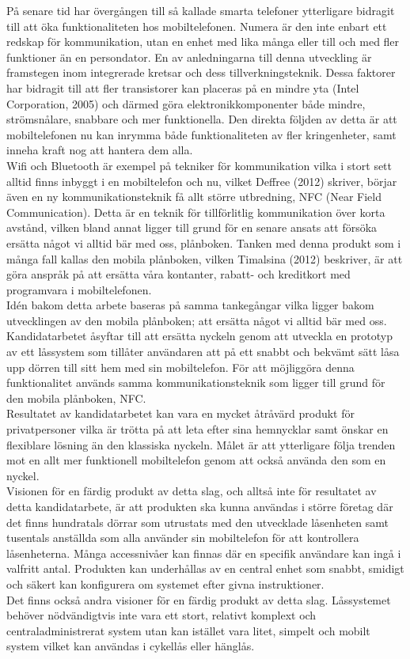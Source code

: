 \documentclass[11pt]{article}
\begin{document}
På senare tid har övergången till så kallade smarta telefoner ytterligare bidragit till att öka funktionaliteten hos mobiltelefonen. Numera är den inte enbart ett redskap för kommunikation, utan en enhet med lika många eller till och med fler funktioner än en persondator. En av anledningarna till denna utveckling är framstegen inom integrerade kretsar och dess tillverkningsteknik. Dessa faktorer har bidragit till att fler transistorer kan placeras på en mindre yta (Intel Corporation, 2005) och därmed göra elektronikkomponenter både mindre, strömsnålare, snabbare och mer funktionella. Den direkta följden av detta är att mobiltelefonen nu kan inrymma både funktionaliteten av fler kringenheter, samt inneha kraft nog att hantera dem alla.\\
Wifi och Bluetooth är exempel på tekniker för kommunikation vilka i stort sett alltid finns inbyggt i en mobiltelefon och nu, vilket Deffree (2012) skriver, börjar även en ny kommunikationsteknik få allt större utbredning, NFC (Near Field Communication). Detta är en teknik för tillförlitlig kommunikation över korta avstånd, vilken bland annat ligger till grund för en senare ansats att försöka ersätta något vi alltid bär med oss, plånboken. Tanken med denna produkt som i många fall kallas den mobila plånboken, vilken Timalsina (2012) beskriver, är att göra anspråk på att ersätta våra kontanter, rabatt- och kreditkort med programvara i mobiltelefonen.\\
Idén bakom detta arbete baseras på samma tankegångar vilka ligger bakom utvecklingen av den mobila plånboken; att ersätta något vi alltid bär med oss. Kandidatarbetet åsyftar till att ersätta nyckeln genom att utveckla en prototyp av ett låssystem som tillåter användaren att på ett snabbt och bekvämt sätt låsa upp dörren till sitt hem med sin mobiltelefon. För att möjliggöra denna funktionalitet används samma kommunikationsteknik som ligger till grund för den mobila plånboken, NFC.\\
Resultatet av kandidatarbetet kan vara en mycket åtråvärd produkt för privatpersoner vilka är trötta på att leta efter sina hemnycklar samt önskar en flexiblare lösning än den klassiska nyckeln. Målet är att ytterligare följa trenden mot en allt mer funktionell mobiltelefon genom att också använda den som en nyckel.\\
Visionen för en färdig produkt av detta slag, och alltså inte för resultatet av detta kandidatarbete, är att produkten ska kunna användas i större företag där det finns hundratals dörrar som utrustats med den utvecklade låsenheten samt tusentals anställda som alla använder sin mobiltelefon för att kontrollera låsenheterna. Många accessnivåer kan finnas där en specifik användare kan ingå i valfritt antal. Produkten kan underhållas av en central enhet som snabbt, smidigt och säkert kan konfigurera om systemet efter givna instruktioner.\\
Det finns också andra visioner för en färdig produkt av detta slag. Låssystemet behöver nödvändigtvis inte vara ett stort, relativt komplext och centraladministrerat system utan kan istället vara litet, simpelt och mobilt system vilket kan användas i cykellås eller hänglås.
\end{document}
